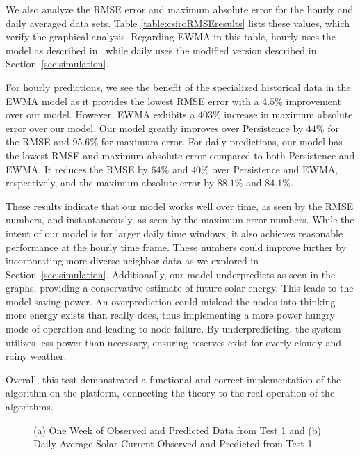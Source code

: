 \documentclass[prodmode,acmtosn]{acmsmall}
\begin{document}
We also analyze the RMSE error and maximum absolute error for the hourly and daily averaged data sets.
Table \ref{table:csiroRMSEresults} lists these values, which verify the graphical analysis.
Regarding EWMA in this table, hourly uses the model as described in~\cite{hsuISPLED2006,kansalDAC2006} while daily uses the modified version described in Section~\ref{sec:simulation}.

For hourly predictions, we see the benefit of the specialized historical data in the EWMA model as it provides the lowest RMSE error with a $4.5\%$ improvement over our model.
However, EWMA exhibits a $403\%$ increase in maximum absolute error over our model. 
Our model greatly improves over Persistence by $44\%$ for the RMSE and $95.6\%$ for maximum error.
For daily predictions, our model has the lowest RMSE and maximum absolute error compared to both Persistence and EWMA.
It reduces the RMSE by $64\%$ and $40\%$ over Persistence and EWMA, respectively, and the maximum absolute error by $88.1\%$ and $84.1\%$.

These results indicate that our model works well over time, as seen by the RMSE numbers, and instantaneously, as seen by the maximum error numbers.
While the intent of our model is for larger daily time windows, it also achieves reasonable performance at the hourly time frame.
These numbers could improve further by incorporating more diverse neighbor data as we explored in Section~\ref{sec:simulation}.
Additionally, our model underpredicts as seen in the graphs, providing a conservative estimate of future solar energy.
This leads to the model saving power.
An overprediction could mislead the nodes into thinking more energy exists than really does, thus implementing a more power hungry mode of operation and leading to node failure.
By underpredicting, the system utilizes less power than necessary, ensuring reserves exist for overly cloudy and rainy weather.

Overall, this test demonstrated a functional and correct implementation of the algorithm on the platform, connecting the theory to the real operation of the algorithms.\newline

\begin{figure*}[htb]
\centering
\caption{(a) One Week of Observed and Predicted Data from Test 1 and (b) Daily Average Solar Current Observed and Predicted from Test 1}
\label{fig:dataResults}
\end{figure*}
\end{document}
